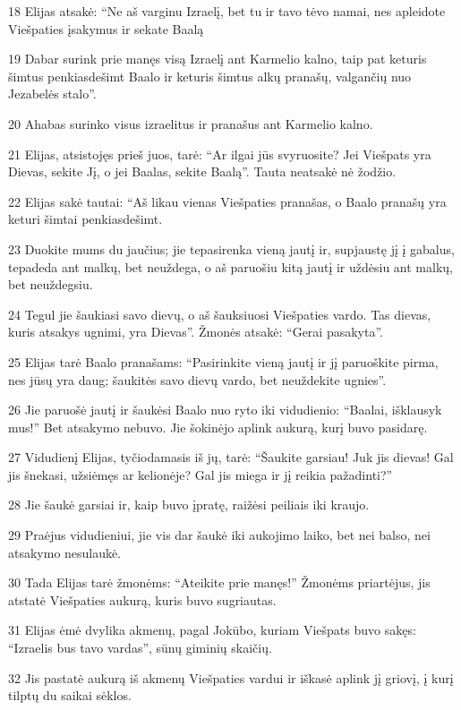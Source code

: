\par 18 Elijas atsakė: “Ne aš varginu Izraelį, bet tu ir tavo tėvo namai, nes apleidote Viešpaties įsakymus ir sekate Baalą 
\par 19 Dabar surink prie manęs visą Izraelį ant Karmelio kalno, taip pat keturis šimtus penkiasdešimt Baalo ir keturis šimtus alkų pranašų, valgančių nuo Jezabelės stalo”. 
\par 20 Ahabas surinko visus izraelitus ir pranašus ant Karmelio kalno. 
\par 21 Elijas, atsistojęs prieš juos, tarė: “Ar ilgai jūs svyruosite? Jei Viešpats yra Dievas, sekite Jį, o jei Baalas, sekite Baalą”. Tauta neatsakė nė žodžio. 
\par 22 Elijas sakė tautai: “Aš likau vienas Viešpaties pranašas, o Baalo pranašų yra keturi šimtai penkiasdešimt. 
\par 23 Duokite mums du jaučius; jie tepasirenka vieną jautį ir, supjaustę jį į gabalus, tepadeda ant malkų, bet neuždega, o aš paruošiu kitą jautį ir uždėsiu ant malkų, bet neuždegsiu. 
\par 24 Tegul jie šaukiasi savo dievų, o aš šauksiuosi Viešpaties vardo. Tas dievas, kuris atsakys ugnimi, yra Dievas”. Žmonės atsakė: “Gerai pasakyta”. 
\par 25 Elijas tarė Baalo pranašams: “Pasirinkite vieną jautį ir jį paruoškite pirma, nes jūsų yra daug; šaukitės savo dievų vardo, bet neuždekite ugnies”. 
\par 26 Jie paruošė jautį ir šaukėsi Baalo nuo ryto iki vidudienio: “Baalai, išklausyk mus!” Bet atsakymo nebuvo. Jie šokinėjo aplink aukurą, kurį buvo pasidarę. 
\par 27 Vidudienį Elijas, tyčiodamasis iš jų, tarė: “Šaukite garsiau! Juk jis dievas! Gal jis šnekasi, užsiėmęs ar kelionėje? Gal jis miega ir jį reikia pažadinti?” 
\par 28 Jie šaukė garsiai ir, kaip buvo įpratę, raižėsi peiliais iki kraujo. 
\par 29 Praėjus vidudieniui, jie vis dar šaukė iki aukojimo laiko, bet nei balso, nei atsakymo nesulaukė. 
\par 30 Tada Elijas tarė žmonėms: “Ateikite prie manęs!” Žmonėms priartėjus, jis atstatė Viešpaties aukurą, kuris buvo sugriautas. 
\par 31 Elijas ėmė dvylika akmenų, pagal Jokūbo, kuriam Viešpats buvo sakęs: “Izraelis bus tavo vardas”, sūnų giminių skaičių. 
\par 32 Jis pastatė aukurą iš akmenų Viešpaties vardui ir iškasė aplink jį griovį, į kurį tilptų du saikai sėklos. 
